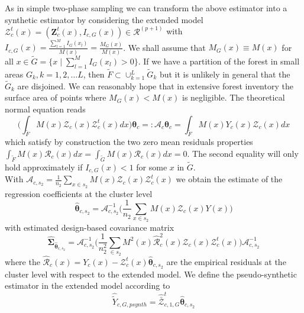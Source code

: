 \documentclass[a4paper,12pt,leqno, titlepage]{article}
\begin{document}
As in simple two-phase sampling we can transform the above estimator into a synthetic estimator by considering the extended model $\pmb{\mathcal{Z}}_c^t(x)=(\pmb{Z}_c^t(x),I_{c,G}(x))\in{\mathcal{R}}^{(p+1)}$ with
$I_{c,G}(x)=\frac{\sum_{l=1}^M I_G(x_l)}{M(x)}=\frac{M_G(x)}{M(x)}$. We shall assume that $M_G(x)\equiv M(x)$ for all $x\in{\tilde{G}}=\{x \mid \sum_{l=1}^M I_G(x_l)>0\}$. If we have a partition of the forest in small areas $G_k, k=1,2,\ldots L$, then $\tilde{F} \subset \cup_{k=1}^L \tilde{G}_k$ but it is unlikely in general that the $\tilde{G}_k$ are disjoined. We can reasonably hope that in extensive forest inventory the surface area of points where $M_G(x)< M(x)$ is negligible. The theoretical normal equation
reads
\begin{equation}
\Big(\int_{\tilde{F}}M(x)\pmb{\mathcal{Z}}_c(x)\pmb{\mathcal{Z}}_c^t(x)dx\Big)\pmb{\theta}_c=:
\pmb{\mathcal{A}}_c\pmb{\theta}_c=\int_{\tilde{F}}M(x)Y_c(x)\pmb{\mathcal{Z}}_c(x)dx
\end{equation}
 which satisfy by construction the two zero mean residuals properties
$\int_{\tilde{F}} M(x)\mathcal{R}_c(x)dx=\int_{\tilde{G}} M(x)\mathcal{R}_c(x)dx=0$.
The second equality will only hold approximately if $I_{c,G}(x)<1$ for some $x$ in $\tilde{G}$.\\
With
$\pmb{\mathcal{A}}_{c,s_2}
=\frac{1}{n_2}\sum_{x\in{s_2}}M(x)\pmb{\mathcal{Z}}_c(x)\pmb{\mathcal{Z}}_c^t(x)$
we obtain the estimate of the regression coefficients at the cluster level
\begin{equation}\label{regcoeffclusterext}
\hat{\pmb{\theta}}_{c,s_2}=\pmb{\mathcal{A}}^{-1}_{c,s_2}\Big(\frac{1}{n_2}\sum_{x\in{s_2}}M(x)
\pmb{\mathcal{Z}}_c(x)Y(x)\Big)
\end{equation}
with estimated design-based covariance matrix
\begin{equation}\label{regcoeffclusterextestvar}
\hat{\pmb{\Sigma}}_{\hat{\pmb{\theta}}_{c,s_2}}=
\pmb{\mathcal{A}}^{-1}_{c,s_2}\Big(\frac{1}{n^2_2}\sum_{\in{s_2}}M^2(x)\hat{\mathcal{R}}_c^2(x)
\pmb{\mathcal{Z}}_c(x)\pmb{\mathcal{Z}}^t_c(x)\Big)\pmb{\mathcal{A}}^{-1}_{c,s_2}
\end{equation}
where the $\hat{\mathcal{R}}_c(x)=Y_c(x)-\pmb{\mathcal{Z}}^t_c(x)\hat{\pmb{\theta}}_{c,s_2}$ are the empirical residuals at the cluster level with respect to the extended model. We define the pseudo-synthetic estimator in the extended model according to
\begin{equation}\label{estimatorclusterextended}
\hat{\tilde{Y}}_{c,G,psynth}=\hat{\bar{\pmb{\mathcal{Z}}}}_{c,1,G}^t\hat{\pmb{\theta}}_{c,s_2}
\end{equation}
\end{document}

